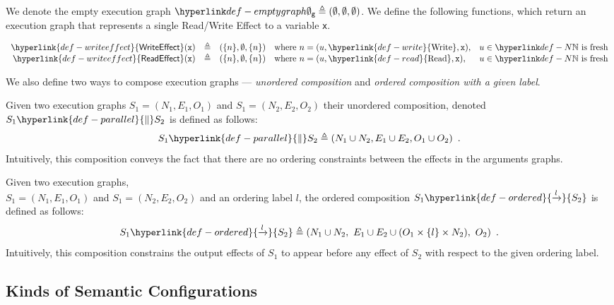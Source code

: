 \documentclass{book}
\newcommand\Read[0]{\hyperlink{def-read}{\text{Read}}}
\newcommand\Write[0]{\hyperlink{def-write}{\text{Write}}}
\newcommand\WriteEffect[0]{\hyperlink{def-writeeffect}{\textsf{WriteEffect}}}
\newcommand\ReadEffect[0]{\hyperlink{def-writeeffect}{\textsf{ReadEffect}}}
\newcommand\ordered[3]{{#1}\hyperlink{def-ordered}{\xrightarrow{#2}}{#3}}
\newcommand\parallelcomp[0]{\hyperlink{def-parallel}{\parallel}}
\begin{document}
We denote the empty execution graph $\emptygraph \triangleq (\emptyset, \emptyset, \emptyset)$.
%
We define the following functions, which return an execution graph that represents a single Read/Write Effect to a variable \texttt{x}.
\hypertarget{def-writeeffect}{}
\hypertarget{def-readeffect}{}
\begin{definition}
\[
  \begin{array}{rclll}
    \WriteEffect(\vx) &\triangleq& (\{n\}, \emptyset, \{n\}) & \text{where } n=(u, \Write, \vx), & u\in\N \text{ is fresh}\\
    \ReadEffect(\vx)  &\triangleq& (\{n\}, \emptyset, \{n\}) & \text{where } n=(u, \Read, \vx),   & u\in\N \text{ is fresh}\\
  \end{array}
\]
\end{definition}

We also define two ways to compose execution graphs --- \emph{unordered composition} and
\emph{ordered composition with a given label}.

\hypertarget{def-parallel}{}
\begin{definition}
Given two execution graphs $S_1 = (N_1, E_1, O_1)$ and $S_1 = (N_2, E_2, O_2)$ their unordered composition,
denoted $S_1 \parallelcomp S_2$ is defined as follows:
\[
  S_1 \parallelcomp S_2\triangleq (N_1 \cup N_2, E_1 \cup E_2, O_1 \cup O_2) \enspace.
\]
Intuitively, this composition conveys the fact that there are no ordering constraints between the effects
in the arguments graphs.
\end{definition}

\hypertarget{def-ordered}{}
\begin{definition}
Given two execution graphs, \\ $S_1 = (N_1, E_1, O_1)$ and $S_1 = (N_2, E_2, O_2)$ and an ordering label $l$,
the ordered composition $\ordered{S_1}{l}{S_2}$ is defined as follows:
\[
  \ordered{S_1}{l}{S_2} \triangleq (N_1 \cup N_2,\ E_1 \cup E_2 \cup (O_1 \times \{l\} \times N_2),\ O_2) \enspace.
\]
Intuitively, this composition constrains the output effects of $S_1$ to appear before any effect of $S_2$ with respect
to the given ordering label.
\end{definition}

\subsection{Kinds of Semantic Configurations \label{sec:KindsOfSemanticConfigurations}}
\end{document}
